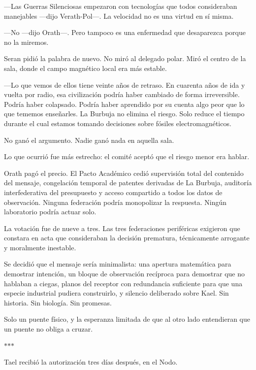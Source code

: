 \documentclass[11pt,a5paper,twoside]{book}
\begin{document}
—Las Guerras Silenciosas empezaron con tecnologías que todos consideraban manejables —dijo Verath-Pol—. La velocidad no es una virtud en sí misma.

—No —dijo Orath—. Pero tampoco es una enfermedad que desaparezca porque no la miremos.

Seran pidió la palabra de nuevo. No miró al delegado polar. Miró el centro de la sala, donde el campo magnético local era más estable.

—Lo que vemos de ellos tiene veinte años de retraso. En cuarenta años de ida y vuelta por radio, esa civilización podría haber cambiado de forma irreversible. Podría haber colapsado. Podría haber aprendido por su cuenta algo peor que lo que tememos enseñarles. La Burbuja no elimina el riesgo. Solo reduce el tiempo durante el cual estamos tomando decisiones sobre fósiles electromagnéticos.

No ganó el argumento. Nadie ganó nada en aquella sala.

Lo que ocurrió fue más estrecho: el comité aceptó que el riesgo menor era hablar.

Orath pagó el precio. El Pacto Académico cedió supervisión total del contenido del mensaje, congelación temporal de patentes derivadas de La Burbuja, auditoría interfederativa del presupuesto y acceso compartido a todos los datos de observación. Ninguna federación podría monopolizar la respuesta. Ningún laboratorio podría actuar solo.

La votación fue de nueve a tres. Las tres federaciones periféricas exigieron que constara en acta que consideraban la decisión prematura, técnicamente arrogante y moralmente inestable.

Se decidió que el mensaje sería minimalista: una apertura matemática para demostrar intención, un bloque de observación recíproca para demostrar que no hablaban a ciegas, planos del receptor con redundancia suficiente para que una especie industrial pudiera construirlo, y silencio deliberado sobre Kael. Sin historia. Sin biología. Sin promesas.

Solo un puente físico, y la esperanza limitada de que al otro lado entendieran que un puente no obliga a cruzar.

\vspace{1.5em}
\begin{center}$\ast$\quad$\ast$\quad$\ast$\end{center}
\vspace{1.5em}

Tael recibió la autorización tres días después, en el Nodo.
\end{document}
